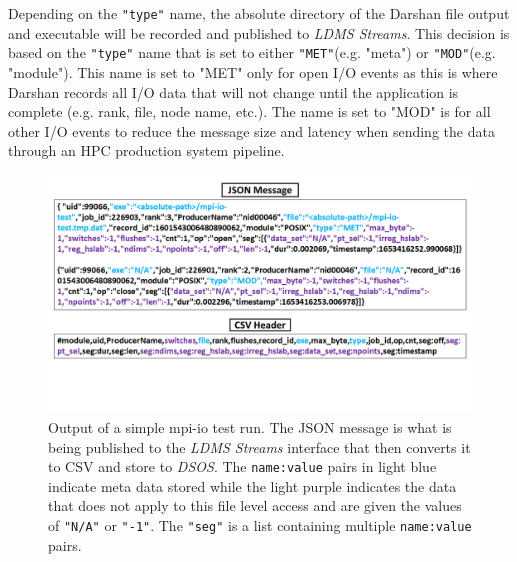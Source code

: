 Depending on the \texttt{"type"} name, the absolute directory of the Darshan file output and executable will be recorded and published to \emph{LDMS Streams}. This decision is based on the \texttt{"type"} name that is set to either \texttt{"MET"}(e.g. "meta") or \texttt{"MOD"}(e.g. "module"). This name is set to "MET" only for open I/O events as this is where Darshan records all I/O data that will not change until the application is complete (e.g. rank, file, node name, etc.). The name is set to "MOD" is for all other I/O events to reduce the message size and latency when sending the data through an HPC production system pipeline.

\begin{figure}
	\centering
	\includegraphics[trim={0 4cm 0 0},clip, width=1\linewidth]{figs/darshan-csv-json.png}
	\caption{Output of a simple mpi-io test run. The JSON message is what is being published to the \emph{LDMS Streams} interface that then converts it to CSV and store to \emph{DSOS}. The \texttt{name:value} pairs in light blue indicate meta data stored while the light purple indicates the data that does not apply to this file level access and are given the values of \texttt{"N/A"} or \texttt{"-1"}. The \texttt{"seg"} is a list containing multiple \texttt{name:value} pairs.}
	\label{f:CSV Header and Output}
\end{figure}

